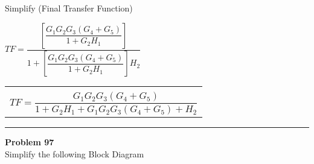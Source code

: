 \documentclass[11pt,letterpaper]{article}
\begin{document}
Simplify (Final Transfer Function)\\
\begin{center}
	$TF=\dfrac{\left[\dfrac{G_1G_2G_3(G_4+G_5)}{1+G_2H_1}\right] }{1+\left[\dfrac{G_1G_2G_3(G_4+G_5)}{1+G_2H_1}\right]H_2}$\\[15pt]
	\begin{tabular}{|c|}
		\hline \\
	$TF=\dfrac{G_1G_2G_3(G_4+G_5)}{1+G_2H_1+G_1G_2G_3(G_4+G_5)+H_2}$\\[12pt]
	\hline
	\end{tabular}
\end{center}


\clearpage


\rule{\textwidth}{1pt}
\textbf{Problem 97}\\
Simplify the following Block Diagram\\
\end{document}
